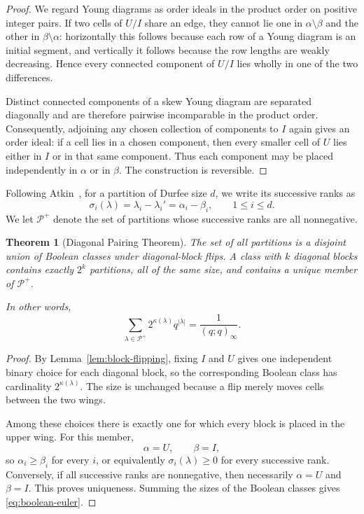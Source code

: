 \documentclass[11pt]{article}
\newtheorem{theorem}{Theorem}[section]
\theoremstyle{definition}
\theoremstyle{remark}
\begin{document}
\begin{proof}
We regard Young diagrams as order ideals in the product order on positive integer pairs.  If two cells of $U/I$ share an edge, they cannot lie one in $\alpha\setminus\beta$ and the other in $\beta\setminus\alpha$: horizontally this follows because each row of a Young diagram is an initial segment, and vertically it follows because the row lengths are weakly decreasing.  Hence every connected component of $U/I$ lies wholly in one of the two differences.

Distinct connected components of a skew Young diagram are separated diagonally and are therefore pairwise incomparable in the product order.  Consequently, adjoining any chosen collection of components to $I$ again gives an order ideal: if a cell lies in a chosen component, then every smaller cell of $U$ lies either in $I$ or in that same component.  Thus each component may be placed independently in $\alpha$ or in $\beta$.  The construction is reversible.
\end{proof}

Following Atkin~\cite{Atkin1966}, for a partition of Durfee size $d$, we write its successive ranks as
\[
 \sigma_i(\lambda)=\lambda_i-\lambda_i'
 =\alpha_i-\beta_i,
 \qquad 1\leq i\leq d.
\]
We let $\mathcal P^+$ denote the set of partitions whose successive ranks are all nonnegative.

\begin{theorem}[Diagonal Pairing Theorem]\label{thm:diagonal-pairing}
The set of all partitions is a disjoint union of Boolean classes under diagonal-block flips.  A class with $k$ diagonal blocks contains exactly $2^k$ partitions, all of the same size, and contains a unique member of $\mathcal P^+$.

In other words,
\begin{equation}\label{eq:boolean-euler}
 \sum_{\lambda\in\mathcal P^+}2^{\kappa(\lambda)}q^{|\lambda|}
 =\frac{1}{(q;q)_\infty}.
\end{equation}
\end{theorem}

\begin{proof}
By Lemma~\ref{lem:block-flipping}, fixing $I$ and $U$ gives one independent binary choice for each diagonal block, so the corresponding Boolean class has cardinality $2^{\kappa(\lambda)}$.  The size is unchanged because a flip merely moves cells between the two wings.

Among these choices there is exactly one for which every block is placed in the upper wing.  For this member,
\[
 \alpha=U,
 \qquad
 \beta=I,
\]
so $\alpha_i\geq\beta_i$ for every $i$, or equivalently $\sigma_i(\lambda)\geq0$ for every successive rank.  Conversely, if all successive ranks are nonnegative, then necessarily $\alpha=U$ and $\beta=I$.  This proves uniqueness.  Summing the sizes of the Boolean classes gives \eqref{eq:boolean-euler}.
\end{proof}
\end{document}
